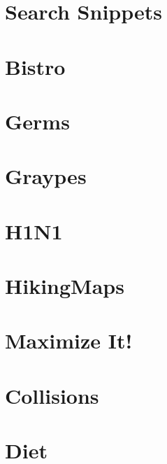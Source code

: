 \documentclass[a4paper, 10pt]{article}
\let\stdsection\section
\renewcommand\section{\newpage\stdsection}
\newcommand{\includecode}[1]{
    }
\newcommand{\algoAuthor}{2} %
\begin{document}
    \section{Search Snippets}
        \includecode{../problems/w06/Search_Snippets/SearchSnippets\algoAuthor.cpp}
              
    
    \section{Bistro}
        \includecode{../problems/w07/Bistro/Bistro\algoAuthor.cpp}
        
    \section{Germs}
        \includecode{../problems/w07/Germs/Germs\algoAuthor.cpp}
        
    \section{Graypes}
        \includecode{../problems/w07/Graypes/Graypes\algoAuthor.cpp}
        
    \section{H1N1}
        \includecode{../problems/w07/H1N1/H1N1_\algoAuthor.cpp}
    
    \section{HikingMaps}
        \includecode{../problems/w07/HikingMaps/HikingMaps\algoAuthor.cpp}
    
    
    \section{Maximize It!}
        \includecode{../problems/w08/Maximize_It/MaximizeIt\algoAuthor.cpp}
        
    \section{Collisions}
        \includecode{../problems/w08/Collisions/Collisions\algoAuthor.cpp}
        
    \section{Diet}
        \includecode{../problems/w08/Diet/Diet\algoAuthor.cpp}
        
\end{document}
